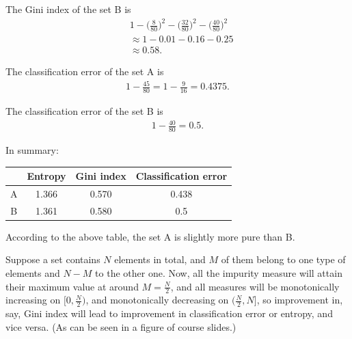 \documentclass[10pt]{article}
\begin{document}
The Gini index of the set B is
\begin{align*}
&1 - \Bigg( \frac{8}{80} \Bigg)^2 - \Bigg( \frac{32}{80} \Bigg)^2 - \Bigg( \frac{40}{80} \Bigg)^2 \\
&\approx 1 - 0.01 - 0.16 - 0.25 \\
&\approx 0.58.
\end{align*}

The classification error of the set A is
\begin{align*}
1 - \frac{45}{80} = 1 - \frac{9}{16} = 0.4375.
\end{align*}

The classification error of the set B is
\begin{align*}
1 - \frac{40}{80} = 0.5.
\end{align*}

In summary:
\begin{table}[h]
\centering
\begin{tabular}[H]{|c||c|c|c|}
\hline
 & Entropy & Gini index & Classification error \\
 \hline
 A & 1.366 & 0.570 & 0.438 \\
 \hline
 B & 1.361 & 0.580 & 0.5 \\
 \hline
\end{tabular}
\end{table}
According to the above table, the set A is slightly more pure than B.

Suppose a set contains $N$ elements in total, and $M$ of them belong to one type of elements and $N - M$ to the other one. Now, all the impurity measure will attain their maximum value at around $M = \frac{N}{2}$, and all measures will be monotonically increasing on $[0, \frac{N}{2})$, and monotonically decreasing on $(\frac{N}{2}, N]$, so improvement in, say, Gini index will lead to improvement in classification error or entropy, and vice versa. (As can be seen in a figure of course slides.)

\color{blue}
\end{document}

